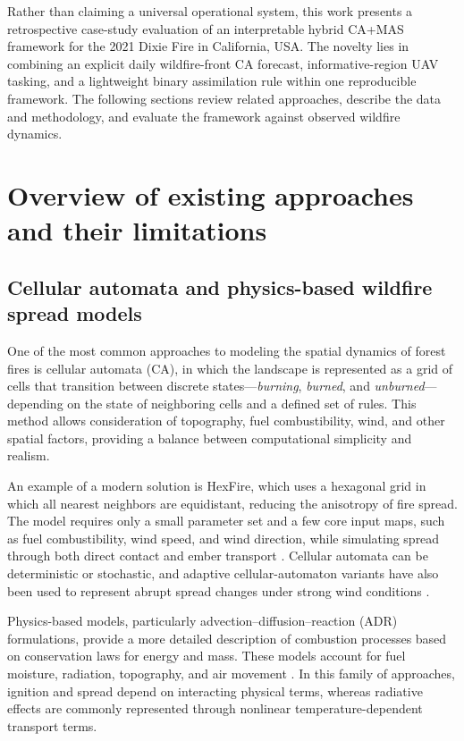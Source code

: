 \documentclass[10pt,letterpaper]{article}
\begin{document}
Rather than claiming a universal operational system, this work presents
a retrospective case-study evaluation of an interpretable hybrid CA+MAS
framework for the 2021 Dixie Fire in California, USA. The novelty lies
in combining an explicit daily
wildfire-front CA forecast, informative-region UAV tasking, and a
lightweight binary assimilation rule within one reproducible framework.
The following sections review related approaches, describe the data and
methodology, and evaluate the framework against observed wildfire
dynamics.

\section*{Overview of existing approaches and their limitations}

\subsection*{Cellular automata and physics-based wildfire spread models}

One of the most common approaches to modeling the spatial dynamics of
forest fires is cellular automata (CA), in which the landscape is
represented as a grid of cells that transition between discrete
states---\emph{burning}, \emph{burned}, and \emph{unburned}---depending on the state of
neighboring cells and a defined set of rules. This method allows
consideration of topography, fuel combustibility, wind, and other
spatial factors, providing a balance between computational simplicity
and realism.

An example of a modern solution is HexFire, which uses a hexagonal grid
in which all nearest neighbors are equidistant, reducing the anisotropy
of fire spread. The model requires only a small parameter set and a few
core input maps, such as fuel combustibility, wind speed, and wind
direction, while simulating spread through both direct contact and ember
transport \cite{schumaker2022}. Cellular automata can be deterministic
or stochastic, and adaptive cellular-automaton variants have also been
used to represent abrupt spread changes under strong wind conditions
\cite{freire2019}.

Physics-based models, particularly
advection--diffusion--reaction (ADR) formulations, provide a more
detailed description of combustion processes based on conservation laws
for energy and mass. These models account for fuel moisture, radiation,
topography, and air movement \cite{navasmontilla2025}. In this family of
approaches, ignition and spread depend on interacting physical terms,
whereas radiative effects are commonly represented through nonlinear
temperature-dependent transport terms.
\end{document}
